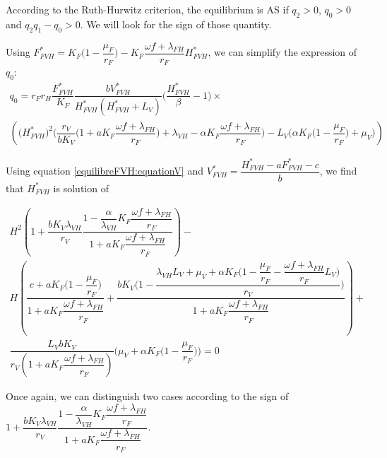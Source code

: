 \documentclass{article}
\newcommand{\lf}{\lambda_{FH}}
\newcommand{\lv}{\lambda_{VH}}
\newcommand{\FHterme}{\omega f + \lf}
\begin{document}
\begin{itemize}
According to the Ruth-Hurwitz criterion, the equilibrium is AS if $q_2 > 0$, $q_0 > 0$ and $q_2 q_1 - q_0 > 0$. We will look for the sign of those quantity.

Using $F^*_{FVH} = K_F\Big(1 - \dfrac{\mu_F}{r_F} \Big) - K_F\dfrac{\FHterme}{r_F} H^*_{FVH}$, we can simplify the expression of $q_0$:
\begin{multline}
q_0 = r_F r_H \dfrac{F^*_{FVH}}{K_F} \dfrac{bV^*_{FVH}}{H^*_{FVH}(H^*_{FVH}+L_V)}\Big(\dfrac{H^*_{FVH}}{\beta}-1\Big) \times \\
\left( \Big(H^*_{FVH}\Big)^2 \Big(\dfrac{r_V}{bK_V}\Big(1 + aK_F \dfrac{\FHterme}{r_F}\Big) + \lv - \alpha K_F \dfrac{\FHterme}{r_F} \Big)
 - L_V \Big(\alpha K_F\big(1 - \dfrac{\mu_F}{r_F} \big) + \mu_V\Big)  \right)
 \label{equilibreFVH:q0}
\end{multline}

Using equation \eqref{equilibreFVH:equationV} and $V^*_{FVH} = \dfrac{H^*_{FVH} - aF^*_{FVH} - c}{b}$, we find that $H^*_{FVH}$ is solution of

\begin{multline}
H^2 \left(1 + \dfrac{bK_V\lv}{r_V}\dfrac{1- \dfrac{\alpha}{\lv} K_F \dfrac{\FHterme}{r_F}}{1 + a K_F\dfrac{\FHterme}{r_F}} \right) - \\ 
H \left( \dfrac{c + a K_F \Big(1 - \dfrac{\mu_F}{r_F}\Big)}{1 + a K_F\dfrac{\FHterme}{r_F}} +  \dfrac{bK_V \Big( 1 - \dfrac{\lv L_V  + \mu_V + \alpha K_F \Big(1 - \dfrac{\mu_F}{r_F} - \dfrac{\FHterme}{r_F}L_V \Big)}{r_V}\Big)}{1 + a K_F\dfrac{\FHterme}{r_F}} \right) + \\ 
\dfrac{L_V bK_V}{r_V (1 + aK_F \dfrac{\FHterme}{r_F})} \Big(\mu_V + \alpha K_F \big(1 - \dfrac{\mu_F}{r_F} \big)\Big) = 0
\label{equilibreFVH:equationH}
\end{multline}

Once again, we can distinguish two cases according to the sign of $1 + \dfrac{bK_V\lv}{r_V}\dfrac{1- \dfrac{\alpha}{\lv} K_F \dfrac{\FHterme}{r_F}}{1 + a K_F\dfrac{\FHterme}{r_F}}$. 


\end{itemize}
\end{document}

